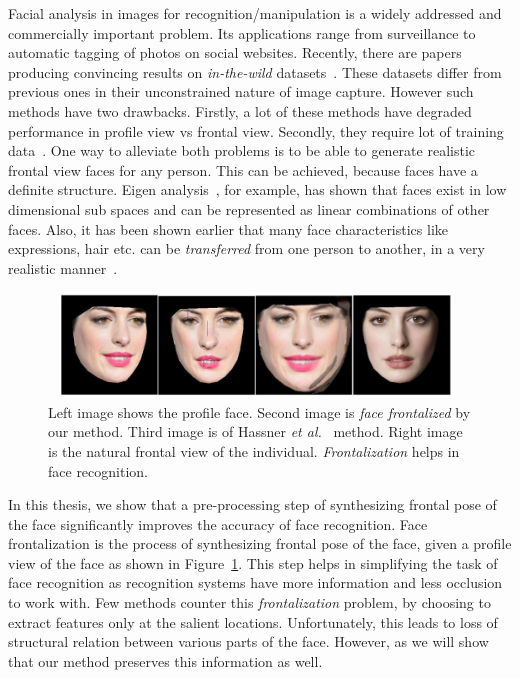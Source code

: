 Facial analysis in images for recognition/manipulation is a widely addressed and commercially important problem. 
Its applications range from surveillance to automatic tagging of photos on social websites. 
Recently, there are papers producing convincing results on {\em in-the-wild}
datasets~\cite{xhucvpr12_wild,DBLP:journals/corr/HassnerHPE14}. These
datasets differ from previous ones in their unconstrained nature of image capture.
However such methods have two drawbacks. Firstly, a lot of these methods have degraded performance in profile view vs frontal view. 
Secondly, they require lot of training data~\cite{HuLT14}. One way to alleviate both problems is to be able 
to generate realistic frontal view faces for any person. This can be achieved, because faces have a definite 
structure. Eigen analysis~\cite{Belhumeur:1997:EVF:261506.261512}, for example, has shown that faces exist in low dimensional sub spaces and can be represented as linear combinations of other faces. Also, it has been shown earlier that many face characteristics like expressions, hair etc. can be \emph{transferred} from one person to another, in a very realistic manner~\cite{conf/fgr/SaragihLC11a}.

\begin{figure}
\begin{center}\includegraphics[width=11.0cm,height=2.8cm]{front/figures/sample_result_f.png}\end{center}
\caption{Left image shows the profile face. Second image is {\em face frontalized} by our method. Third image is of Hassner {\em et al.}~\cite{DBLP:journals/corr/HassnerHPE14} method. Right image is the natural frontal view of the individual. {\em Frontalization} helps in face recognition. }
\label{fig:sample_result}
\end{figure}

In this thesis, we show that a pre-processing step of synthesizing frontal pose of the face
significantly improves the accuracy of face recognition. Face frontalization is the process of
synthesizing frontal pose of the face, given a profile view of the face as shown in
Figure~\ref{fig:sample_result}. This step helps in simplifying the task of face recognition as
recognition systems have more information and less occlusion to work with. Few methods counter this
{\em frontalization} problem, by choosing to extract features only at the salient locations.
Unfortunately, this leads to loss of structural relation between various parts of the face. However,
as we will show that our method preserves this information as well. 


